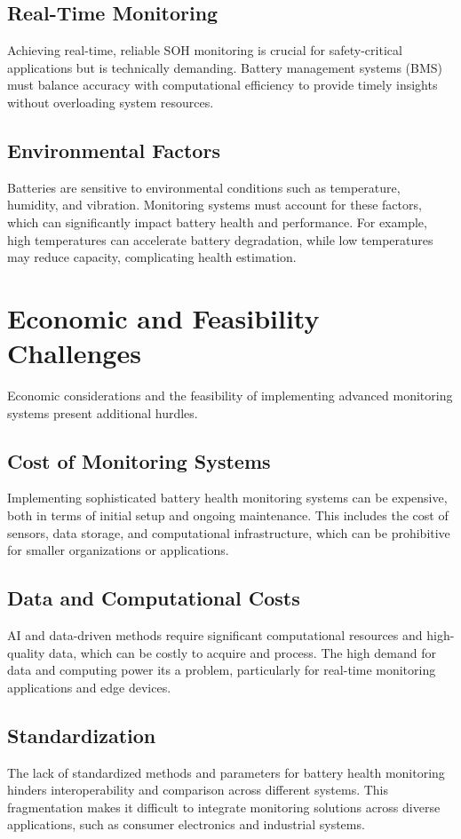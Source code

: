 \subsection{Real-Time Monitoring}
Achieving real-time, reliable SOH monitoring is crucial for safety-critical applications but is technically demanding. 
Battery management systems (BMS) must balance accuracy with computational efficiency to provide timely insights without overloading system resources.

\subsection{Environmental Factors}
Batteries are sensitive to environmental conditions such as temperature, humidity, and vibration. 
Monitoring systems must account for these factors, which can significantly impact battery health and performance. 
For example, high temperatures can accelerate battery degradation, while low temperatures may reduce capacity, complicating health estimation.

\section{Economic and Feasibility Challenges}
Economic considerations and the feasibility of implementing advanced monitoring systems present additional hurdles.

\subsection{Cost of Monitoring Systems}
Implementing sophisticated battery health monitoring systems can be expensive, both in terms of initial setup and ongoing maintenance. 
This includes the cost of sensors, data storage, and computational infrastructure, which can be prohibitive for smaller organizations or applications.

\subsection{Data and Computational Costs}
AI and data-driven methods require significant computational resources and high-quality data, which can be costly to acquire and process. 
The high demand for data and computing power its a problem, particularly for real-time monitoring applications and edge devices.

\subsection{Standardization}
The lack of standardized methods and parameters for battery health monitoring hinders interoperability and comparison across different systems. 
This fragmentation makes it difficult to integrate monitoring solutions across diverse applications, such as consumer electronics and industrial systems.

